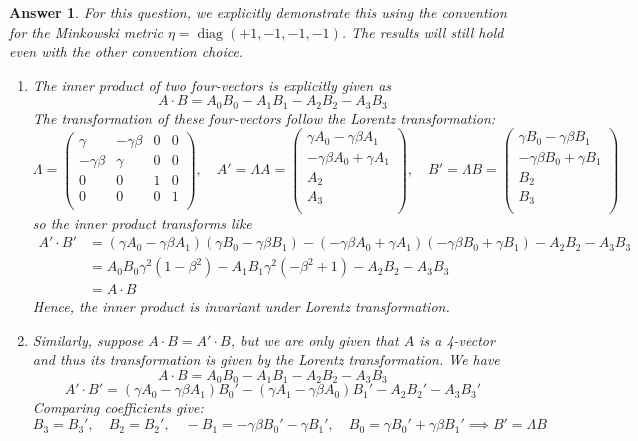 \documentclass[a4paper]{article}
\DeclareMathOperator{\diag}{diag}
\newtheorem{ans}{Answer}
\theoremstyle{new}
\begin{document}
\begin{ans}
For this question, we explicitly demonstrate this using the convention for the Minkowski metric $\eta=\diag(+1,-1,-1,-1)$. The results will still hold even with the other convention choice.
\begin{enumerate}[label=(\roman*)]
\item The inner product of two four-vectors is explicitly given as
$$A\cdot B=A_0B_0-A_1B_1-A_2B_2-A_3B_3$$
The transformation of these four-vectors follow the Lorentz transformation:
$$\Lambda=\begin{pmatrix}\gamma&-\gamma\beta&0&0\\-\gamma\beta&\gamma&0&0\\0&0&1&0\\0&0&0&1\\\end{pmatrix},\quad A'=\Lambda A=\begin{pmatrix}\gamma A_0-\gamma\beta A_1\\-\gamma\beta A_0+\gamma A_1\\A_2\\A_3\\\end{pmatrix},\quad B'=\Lambda B=\begin{pmatrix}\gamma B_0-\gamma\beta B_1\\-\gamma\beta B_0+\gamma B_1\\B_2\\B_3\\\end{pmatrix}$$
so the inner product transforms like
\begin{align}
A'\cdot B'&=(\gamma A_0-\gamma\beta A_1)(\gamma B_0-\gamma\beta B_1)-(-\gamma\beta A_0+\gamma A_1)(-\gamma\beta B_0+\gamma B_1)-A_2B_2-A_3B_3\nonumber\\&=A_0B_0\gamma^2(1-\beta^2)-A_1B_1\gamma^2(-\beta^2+1)-A_2B_2-A_3B_3\nonumber\\&=A\cdot B\nonumber
\end{align}
Hence, the inner product is invariant under Lorentz transformation.
\item Similarly, suppose $A\cdot B=A'\cdot B$, but we are only given that $A$ is a 4-vector and thus its transformation is given by the Lorentz transformation. We have
$$A\cdot B=A_0B_0-A_1B_1-A_2B_2-A_3B_3$$
$$A'\cdot B'=(\gamma A_0-\gamma\beta A_1)B_0'-(\gamma A_1-\gamma\beta A_0)B_1'-A_2B_2'-A_3B_3'$$
Comparing coefficients give:
$$B_3=B_3',\quad B_2=B_2',\quad -B_1=-\gamma\beta B_0'-\gamma B_1',\quad B_0=\gamma B_0'+\gamma\beta B_1'\implies B'=\Lambda B$$
\end{enumerate}
\end{ans}
\end{document}
